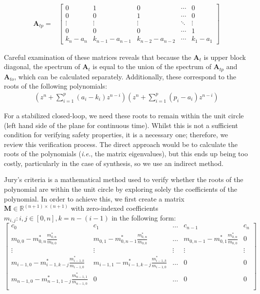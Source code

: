 \documentclass[runningheads,a4paper]{llncs}
\newcommand{\mat}[1]{\boldsymbol{#1}}
\begin{document}
\begin{align*}
\mat{A}_{tp}=&\left[
\begin{array}{ccccc}
0&1&0&\cdots&0\\
0&0&1&\cdots&0\\
\vdots&\vdots&\vdots&\ddots&\vdots\\
0&0&0&\cdots&1\\
k_n-a_n&k_{n-1}-a_{n-1}&k_{n-2}-a_{n-2}&\cdots&k_1-a_1
\end{array}\right]
\label{eq:cf_SISO_2}
\end{align*}

Careful examination of these matrices reveals that because the $\mat{A}_t$ is 
upper block diagonal, the spectrum of $\mat{A}_t$ is equal to the union of the 
spectrum of $\mat{A}_{tp}$ and $\mat{A}_{to}$, which can be calculated separately. 
Additionally, these correspond to the roots of the following polynomials:
%
\begin{align*}
\left(z^n+\sum_{i=1}^p{(a_i-k_i)z^{n-i}}\right) \left(z^n+\sum_{i=1}^p{(p_i-a_i)z^{n-i}}\right)
\end{align*}

For a stabilized closed-loop, we need these roots to remain within the
unit circle (left hand side of the plane for continuous time).  Whilst
this is not a sufficient condition for verifying safety properties, it
is a necessary one; therefore, we review this verification process.  
The direct approach would be to calculate the roots of the
polynomials (\emph{i.e.}, the matrix eigenvalues), but this ends
up being too costly, particularly in the case of synthesis, so we use
an indirect method.

Jury's criteria is a mathematical method used to verify whether the roots 
of the polynomial are within the unit circle by exploring solely the coefficients 
of the polynomial. In order to achieve this, we first create a matrix 
$\mat{M} \in \mathbb{R}^{(n+1) \times (n+1)}$ with zero-indexed coefficients 
$m_{i,j} : i,j \in [0,n],k=n-(i-1)$ in the following form:
%
\begin{equation}
\left[\begin{array}{ccccc}
c_0&c_1&\hdots&c_{n-1}&c_n\\
m_{\scriptscriptstyle 0,0}-m_{\scriptscriptstyle 0,n}^*\frac{m_{0,n}^*}{m_{0,0}}&m_{\scriptscriptstyle 0,1}-m_{\scriptscriptstyle 0,n-1}^*\frac{m_{0,n}^*}{m_{0,0}}&\hdots&m_{\scriptscriptstyle 0,n-1}-m_{\scriptscriptstyle 0,1}^*\frac{m_{0,n}^*}{m_{0,0}}&0\\
\vdots&\vdots&\vdots&\vdots&\vdots\\
m_{\scriptscriptstyle i-1,0}-m_{\scriptscriptstyle i-1,k-j}^*\frac{m_{i-1,k}^*}{m_{i-1,0}}&m_{\scriptscriptstyle i-1,1}-m_{\scriptscriptstyle i-1,k-j}^*\frac{m_{i-1,k}^*}{m_{i-1,0}}&\hdots&0&0\\
m_{\scriptscriptstyle n-1,0}-m_{\scriptscriptstyle n-1,1-j}^*\frac{m_{n-1,1}^*}{m_{n-1,0}}&0&\hdots&0&0\\
\end{array}\right]
\end{equation}
\end{document}
